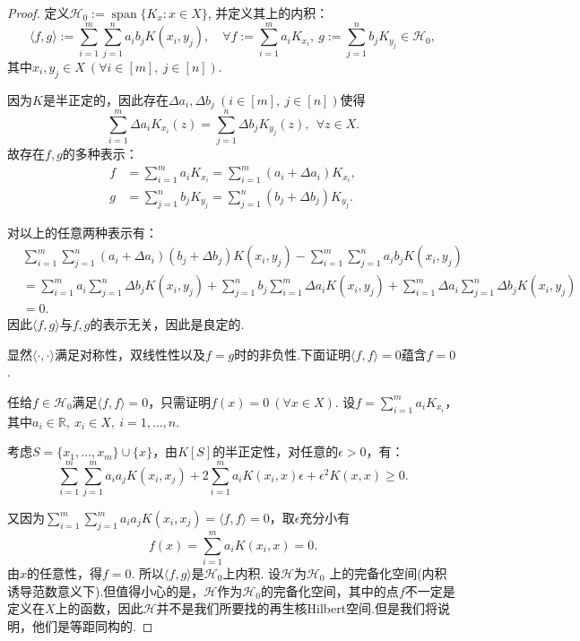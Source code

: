 \documentclass[12pt, a4paper, oneside]{ctexbook}
\begin{document}
\begin{proof}
    定义$\mathcal{H}_0:=\operatorname{span}\{K_x:x\in X\}$, 并定义其上的内积：
    \begin{equation}
        \langle f,g\rangle:=\sum_{i=1}^m\sum_{j=1}^na_ib_jK(x_i,y_j),\quad\forall f:=\sum_{i=1}^ma_iK_{x_i}, ~g:=\sum_{j=1}^nb_jK_{y_j}\in \mathcal{H}_0,
    \end{equation}
    其中$x_i,y_j\in X~(\forall i\in[m],~j\in [n])$.  

    因为$K$是半正定的，因此存在$\Delta a_i,\Delta b_j~(i\in[m],~j\in[n])$使得
    \begin{equation}
        \sum_{i=1}^m\Delta a_i  K_{x_i}(z)=\sum_{j=1}^n\Delta b_j  K_{y_j}(z),~~\forall z\in X.
    \end{equation}
    故存在$f,g$的多种表示：
    \begin{align*}
        f&=\sum_{i=1}^ma_iK_{x_i}=\sum_{i=1}^m(a_i+\Delta a_i)K_{x_i},\\
        g&=\sum_{j=1}^nb_j K_{y_j}=\sum_{j=1}^n(b_j+\Delta b_j)K_{y_j}.
    \end{align*}

    对以上的任意两种表示有：
    \begin{align*}
        &\sum_{i=1}^m\sum_{j=1}^n(a_i+\Delta a_i)(b_j+\Delta b_j)K(x_i,y_j)-\sum_{i=1}^m\sum_{j=1}^na_ib_jK(x_i,y_j)\\
        &=\sum_{i=1}^ma_i\sum_{j=1}^n \Delta b_j K(x_i,y_j)+\sum_{j=1}^n b_j\sum_{i=1}^m\Delta a_i K(x_i,y_j)+\sum_{i=1}^m\Delta a_i\sum_{j=1}^n \Delta b_j K(x_i,y_j)\\
        &=0.
    \end{align*}
因此$\langle f,g\rangle$与$f,g$的表示无关，因此是良定的.

    显然$\langle\cdot,\cdot\rangle$满足对称性，双线性性以及$f=g$时的非负性.下面证明$\langle f,f\rangle=0$蕴含$f=0$.

    任给$f\in \mathcal{H}_0$满足$\langle f,f\rangle=0$，只需证明$f(x)=0~(\forall x\in X)$. 设$f=\sum_{i=1}^m a_i K_{x_i}$，其中$a_i\in\mathbb{R},~x_i\in X,~i=1,\dots,n.$

    考虑$S=\{x_1,\dots,x_m\}\cup \{x\}$，由$K[S]$的半正定性，对任意的$\epsilon>0$，有：
    \begin{equation*}
        \sum_{i=1}^m\sum_{j=1}^m a_i a_j K(x_i,x_j)+2\sum_{i=1}^m a_iK(x_i,x)\epsilon+\epsilon^2K(x,x)\geq 0 .
    \end{equation*}

    又因为$\sum_{i=1}^m\sum_{j=1}^m a_i a_j K(x_i,x_j)=\langle f,f\rangle =0$，取$\epsilon$充分小有
    $$f(x)=\sum_{i=1}^m a_iK(x_i,x)=0.$$
    由$x$的任意性，得$f=0$. 所以$\langle f,g \rangle$是$\mathcal{H}_0$上内积. 设$\mathcal{H}$为$\mathcal{H}_0$ 上的完备化空间(内积诱导范数意义下).但值得小心的是，$\mathcal{H}$作为$\mathcal{H}_0$的完备化空间，其中的点$f$不一定是定义在$X$上的函数，因此$\mathcal{H}$并不是我们所要找的再生核Hilbert空间.但是我们将说明，他们是等距同构的.


\end{proof}
\end{document}
